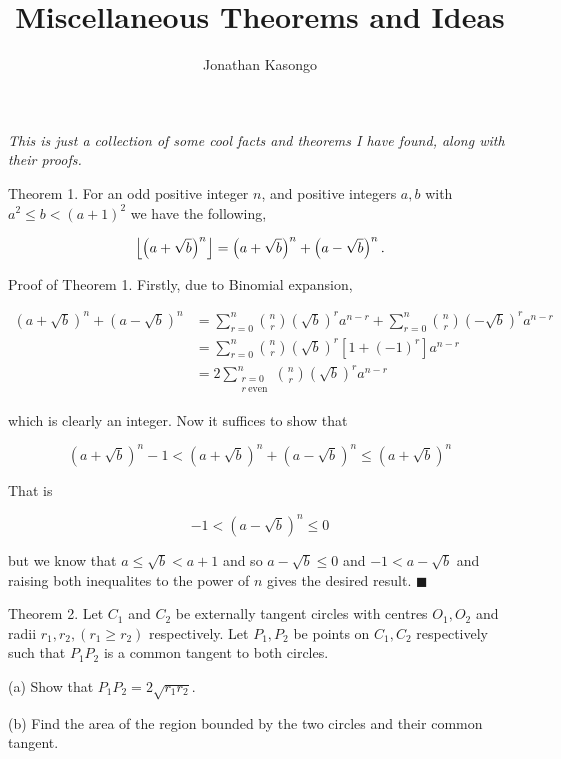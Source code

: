\documentclass{article}
\author{Jonathan Kasongo}
\title{Miscellaneous Theorems and Ideas}
\begin{document}
\maketitle
\textit{This is just a collection of some cool facts and theorems I have
found, along with their proofs.}


\begin{problem}{Theorem 1.}
For an odd positive integer $n$, and positive integers $a,b$ with
$a^2 \leq b < (a+1)^2$ we have the following,

$$
\left\lfloor \left( a + \sqrt{b} \right)^n \right\rfloor =
\left( a + \sqrt{b} \right)^n + \left( a - \sqrt{b} \right)^n.
$$
\end{problem}

\begin{solution}{Proof of Theorem 1.}
Firstly, due to Binomial expansion,

\[
\begin{aligned}
\left( a + \sqrt{b} \right)^n + \left( a - \sqrt{b} \right)^n &=
\sum_{r=0}^n \binom{n}{r} \left(\sqrt{b}\right)^r a^{n-r} +
\sum_{r=0}^n \binom{n}{r} \left(-\sqrt{b}\right)^r a^{n-r} \\
&= \sum_{r=0}^n \binom{n}{r} \left( \sqrt{b} \right)^r \left[ 1 + (-1)^r \right] a^{n - r}\\
&= 2 \sum_{\substack{r=0 \\ r \ \text{even}}}^{n} \binom{n}{r} \left(\sqrt{b}\right)^r
a^{n-r}
\end{aligned}
\]

which is clearly an integer. Now it suffices to show that

\[
\left(a + \sqrt{b}\right)^n - 1 <
\left(a + \sqrt{b}\right)^n + \left(a - \sqrt{b}\right)^n
\leq \left(a + \sqrt{b}\right)^n
\]

That is

$$
-1 < \left(a - \sqrt{b}\right)^n \leq 0
$$

but we know that $a \leq \sqrt{b} < a + 1$ and so
$a - \sqrt{b} \leq 0$ and $-1 < a - \sqrt{b}$ and raising both inequalites
to the power of $n$ gives the desired result. $\blacksquare$
\end{solution}
\newpage


\begin{problem}{Theorem 2.}
Let $C_1$ and $C_2$ be externally tangent circles with centres $O_1, O_2$
and radii $r_1, r_2, (r_1 \geq r_2)$ respectively. Let $P_1, P_2$ be points on $C_1, C_2$
respectively such that $P_1 P_2$ is a common tangent to both circles.
\vspace{0.2cm}

(a) Show that $P_1P_2 = 2\sqrt{r_1 r_2}$.\vspace{0.2cm}

(b) Find the area of the region bounded by the two circles and their common
tangent.
\end{problem}
\end{document}
